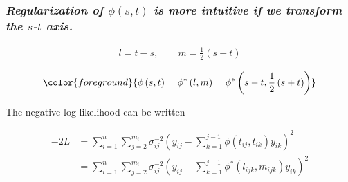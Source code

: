 \documentclass[12pt]{beamer}
\newcommand{\newmaththought}[1]{{ \color{foreground} {#1}}}
\begin{document}
\begin{frame}
\frametitle{\emph{Regularization of $\phi\left(s,t\right)$ is more intuitive if we transform the $s$-$t$ axis. }}

\begin{align*}
l = t-s, \qquad m = \frac{1}{2}\left(s+t\right)
\end{align*}
\noindent

\begin{align*}
\newmaththought{\phi\left(s,t\right) =\phi^*\left(l,m\right)= \phi^*\left(s-t, \frac{1}{2}\left(s+t\right)\right)}
\end{align*}

The negative log likelihood can be written
\begin{adjustwidth}{-2cm}{-2cm}
\begin{align*} \label{loglikelihood}
-2L &= \sum_{i=1}^n \sum_{j=2}^{m_i} \sigma_{ij}^{-2} \left(y_{ij} - \sum_{k=1}^{j-1}\phi\left({t_{ij},t_{ik}}\right)y_{ik} \right)^2 \\
&= \sum_{i=1}^n \sum_{j=2}^{m_i} \sigma_{ij}^{-2} \left(y_{ij} - \sum_{k=1}^{j-1}\phi^*\left({l_{ijk},m_{ijk}}\right)y_{ik} \right)^2 
\end{align*}
\end{adjustwidth}

\end{frame}






%
%
\end{document}
